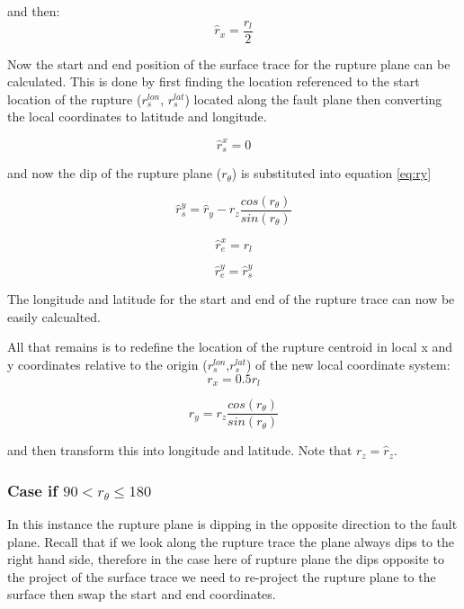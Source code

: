 and then:
\begin{equation}
\hat{r}_x = \frac{r_l}{2}
\end{equation}

Now the start and end position of the surface trace for the rupture plane can be calculated. This is done by first 
finding the location referenced to the start location of the rupture ($r_s^{lon}$, $r_s^{lat}$) located along the fault 
plane then converting the local coordinates to latitude and longitude.

\begin{equation}\label{eq:rsx}
\hat{r}_s^{x} = 0
\end{equation}

and now the dip of the rupture plane ($r_\theta$) is substituted into equation \ref{eq:ry}

\begin{equation}
\hat{r}_s^{y} = \hat{r}_y - r_z  \frac{cos(r_\theta)}{sin(r_\theta)}
\end{equation}

\begin{equation}\label{eq:rex}
\hat{r}_e^{x} = r_l
\end{equation}

\begin{equation}\label{eq:rey}
\hat{r}_e^{y} = \hat{r}_s^{y}
\end{equation}

The longitude and latitude for the start and end of the rupture trace can now be easily calcualted.


All that remains is to redefine the location of the rupture centroid in local x and y coordinates relative to the origin 
($r_s^{lon}$,$ r_s^{lat}$) of the new local coordinate system:
\begin{equation}\label{eq:rx}
r_x = 0.5 r_l
\end{equation}

\begin{equation} \label{eq:ry2}
r_y = r_z  \frac{cos(r_\theta)}{sin(r_\theta)}
\end{equation}

and then transform this into longitude and latitude. Note that $r_z = \hat{r}_z$.

\subsubsection{Case if $90 <  r_\theta \leq 180$} \label{sec:90t180}

In this instance the rupture plane is dipping in the opposite direction to the fault plane. Recall that if we look along 
the rupture trace the plane always dips to the right hand side, therefore in the case here of rupture plane the dips 
opposite to the project of the surface trace we need to re-project the rupture plane to the surface then swap the 
start and end coordinates. 


